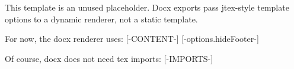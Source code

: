 This template is an unused placeholder. Docx exports pass jtex-style template options to a dynamic renderer, not a static template.

For now, the docx renderer uses:
[-CONTENT-]
[-options.hideFooter-]

Of course, docx does not need tex imports:
[-IMPORTS-]
